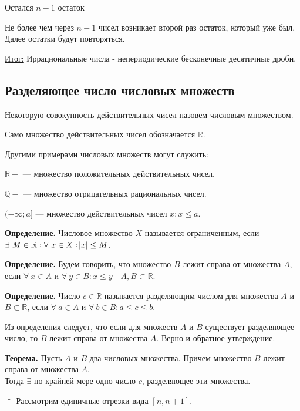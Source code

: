 \documentclass{article}
\begin{document}
        Остался $n - 1$ остаток

        Не более чем через $n - 1$ чисел возникает второй раз остаток, который уже был. Далее остатки будут повторяться.

        \underline{Итог:} Иррациональные числа - непериодические бесконечные десятичные дроби. 

        \subsection{Разделяющее число числовых множеств}
        Некоторую совокупность действительных чисел назовем числовым множеством.
        
        Само множество действительных чисел обозначается $\mathbb{R}$.
        
        Другими примерами числовых множеств могут служить:
        
        $\mathbb{R}+$ --- множество положительных действительных чисел.
        
        $\mathbb{Q}-$ --- множество отрицательных рациональных чисел.
        
        $(-\infty; a]$ --- множество действительных чисел $x: x \leq a$.

        \textbf{Определение.} Числовое множество $X$ называется ограниченным, если $\exists\ M \in \mathbb{R}: \forall\ x \in X: \abs{x} \leq M$.

        \textbf{Определение.} Будем говорить, что множество $B$ лежит справа от множества $A$, если $\forall\ x \in A$ и $\forall\ y \in B: x \leq y \quad A, B \subset \mathbb{R}$.

        

        \textbf{Определение.} Число $c \in \mathbb{R}$ называется разделяющим числом для множества $A$ и $B \subset \mathbb{R}$, если $\forall\ a \in A$ и $\forall\ b \in B: a \leq c \leq b$.

        Из определения следует, что если для множеств $A$ и $B$ существует разделяющее число, то $B$ лежит справа от множества $A$. Верно и обратное утверждение.

        \textbf{Теорема.} Пусть $A$ и $B$ два числовых множества. Причем множество $B$ лежит справа от множества $A$.\\
        Тогда $\exists$ по крайней мере одно число $c$, разделяющее эти множества.

        $\uparrow$
        Рассмотрим единичные отрезки вида $[n,n+1]$.
            
\end{document}
